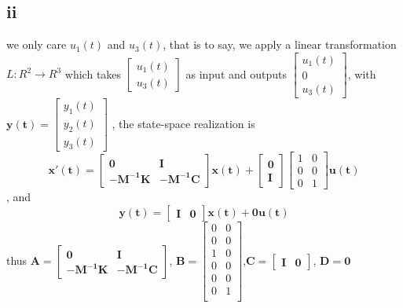 \documentclass[12pt,a4paper]{article}
\begin{document}
\subsection*{ii}
we only care $u_1(t)$ and $u_3(t)$, that is to say, we apply a linear transformation
$L: R^2 \to R^3$ which takes $\begin{bmatrix}
    u_1(t)\\
    u_3(t)
\end{bmatrix} $ as input and outputs
$ \begin{bmatrix}
    u_1(t)\\
    0 \\
    u_3(t)
\end{bmatrix}
$, with $\mathbf{y(t)} = \begin{bmatrix}
    y_1(t)\\
    y_2(t)\\
    y_3(t)
\end{bmatrix}$
, the state-space realization is
\[
    \mathbf{x'(t)} = \begin{bmatrix}
        \mathbf{0} & \mathbf{I}\\
        \mathbf{-\mathbf{M}^{-1}\mathbf{K}} & \mathbf{-\mathbf{M}^{-1}\mathbf{\mathbf{C}}}
    \end{bmatrix}
    \mathbf{x(t)}+ \begin{bmatrix}
        \mathbf{0}\\
        \mathbf{I}
    \end{bmatrix}
    \begin{bmatrix}
        1 & 0 \\
        0 & 0 \\
        0 & 1
    \end{bmatrix}\mathbf{u(t)}
\]
, and
\[
    \mathbf{y(t)} = \begin{bmatrix}
        \mathbf{I} & \mathbf{0}
    \end{bmatrix}
    \mathbf{x(t)} + 
        \mathbf{0}\mathbf{u(t)}
\]
thus $\mathbf{A} = \begin{bmatrix}
    \mathbf{0} & \mathbf{I}\\
    \mathbf{-\mathbf{M}^{-1}\mathbf{K}} & \mathbf{-\mathbf{M}^{-1}\mathbf{\mathbf{C}}}
\end{bmatrix}
$, $ \mathbf{B} = \begin{bmatrix}
    0 & 0 \\
    0 & 0 \\
    1 & 0 \\
    0 & 0 \\
    0 & 0 \\
    0 & 1 \\
\end{bmatrix}$,$\mathbf{C}=\begin{bmatrix}
    \mathbf{I} & \mathbf{0}
\end{bmatrix}$,
$\mathbf{D} = \mathbf{0}$
\end{document}
